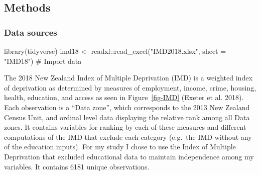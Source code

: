 \documentclass[
  letterpaper,
  DIV=11,
  numbers=noendperiod,
  oneside]{scrartcl}
\newenvironment{Shaded}{\begin{snugshade}}{\end{snugshade}}
\newcommand{\AttributeTok}[1]{\textcolor[rgb]{0.40,0.45,0.13}{#1}}
\newcommand{\CommentTok}[1]{\textcolor[rgb]{0.37,0.37,0.37}{#1}}
\newcommand{\FunctionTok}[1]{\textcolor[rgb]{0.28,0.35,0.67}{#1}}
\newcommand{\NormalTok}[1]{\textcolor[rgb]{0.00,0.23,0.31}{#1}}
\newcommand{\OtherTok}[1]{\textcolor[rgb]{0.00,0.23,0.31}{#1}}
\newcommand{\SpecialCharTok}[1]{\textcolor[rgb]{0.37,0.37,0.37}{#1}}
\newcommand{\StringTok}[1]{\textcolor[rgb]{0.13,0.47,0.30}{#1}}
\begin{document}
\hypertarget{methods}{%
\subsection{Methods}\label{methods}}

\hypertarget{data-sources}{%
\subsubsection{Data sources}\label{data-sources}}

\begin{Shaded}
\begin{Highlighting}[]
\FunctionTok{library}\NormalTok{(tidyverse)}
\NormalTok{imd18 }\OtherTok{\textless{}{-}}\NormalTok{ readxl}\SpecialCharTok{::}\FunctionTok{read\_excel}\NormalTok{(}\StringTok{"IMD2018.xlsx"}\NormalTok{, }\AttributeTok{sheet =} \StringTok{"IMD18"}\NormalTok{) }\CommentTok{\# Import data}
\end{Highlighting}
\end{Shaded}

The 2018 New Zealand Index of Multiple Deprivation (IMD) is a weighted
index of deprivation as determined by measures of employment, income,
crime, housing, health, education, and access as seen in
Figure~\ref{fig-IMD} (Exeter et al. 2018). Each observation is a ``Data
zone'', which corresponds to the 2013 New Zealand Census Unit, and
ordinal level data displaying the relative rank among all Data zones. It
contains variables for ranking by each of these measures and different
computations of the IMD that exclude each category (e.g.~the IMD without
any of the education inputs). For my study I chose to use the Index of
Multiple Deprivation that excluded educational data to maintain
independence among my variables. It contains 6181 unique observations.
\end{document}
